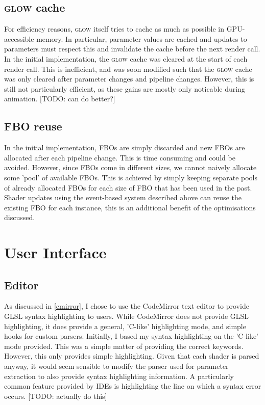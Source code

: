 \documentclass[12pt,twoside,notitlepage]{report}
\begin{document}
\subsection{\textsc{glow} cache}
\label{glow-cache}
For efficiency reasons, \textsc{glow} itself tries to cache as much as possible in GPU-accessible memory. In particular, parameter values are cached and updates to parameters must respect this and invalidate the cache before the next render call. In the initial implementation, the \textsc{glow} cache was cleared at the start of each render call. This is inefficient, and was soon modified such that the \textsc{glow} cache was only cleared after parameter changes and pipeline changes. However, this is still not particularly efficient, as these gains are mostly only noticable during animation. 
[TODO: can do better?]

\subsection{FBO reuse}
In the initial implementation, FBOs are simply discarded and new FBOs are allocated after each pipeline change. This is time consuming and could be avoided. However, since FBOs come in different sizes, we cannot naively allocate some 'pool' of available FBOs. This is achieved by simply keeping separate pools of already allocated FBOs for each size of FBO that has been used in the past. Shader updates using the event-based system described above can reuse the existing FBO for each instance, this is an additional benefit of the optimisations discussed.

\section{User Interface}
\subsection{Editor}
As discussed in \ref{cmirror}, I chose to use the CodeMirror text editor to provide GLSL syntax highlighting to users. While CodeMirror does not provide GLSL highlighting, it does provide a general, 'C-like' highlighting mode, and simple hooks for custom parsers. Initially, I based my syntax highlighting on the 'C-like' mode provided. This was a simple matter of providing the correct keywords. However, this only provides simple highlighting. Given that each shader is parsed anyway, it would seem sensible to modify the parser used for parameter extraction to also provide syntax highlighting information. A particularly common feature provided by IDEs is highlighting the line on which a syntax error occurs. [TODO: actually do this]
\end{document}
